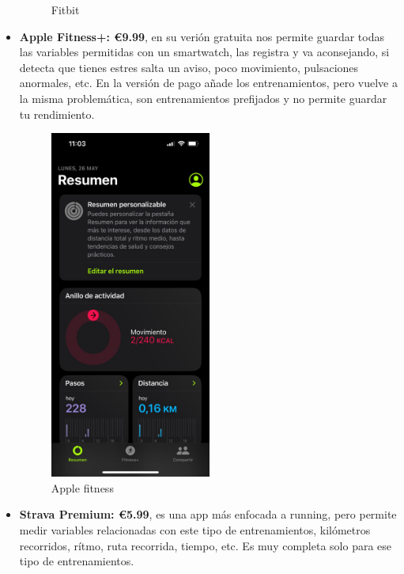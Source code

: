 \begin{itemize}
\begin{figure}[H]
    \caption{Fitbit}
    \label{fig:Fitbit}
\end{figure} 
	\item \textbf{Apple Fitness+: €9.99}, en su verión gratuita nos permite guardar todas las variables permitidas con un smartwatch, las registra y va aconsejando, si detecta que tienes estres salta un aviso, poco movimiento, pulsaciones anormales, etc. En la versión de pago añade los entrenamientos, pero vuelve a la misma problemática, son entrenamientos prefijados y no permite guardar tu rendimiento.
\begin{figure}[H]
   \centering
    \includegraphics[width=0.5\textwidth]{fotos/fitness.jpeg}
    \caption{Apple fitness}
    \label{fig:Apple fitness}
\end{figure} 
	\item \textbf{Strava Premium: €5.99}, es una app más enfocada a running, pero permite medir variables relacionadas con este tipo de entrenamientos, kilómetros recorridos, rítmo, ruta recorrida, tiempo, etc. Es muy completa solo para ese tipo de entrenamientos.
\begin{figure}[H]
   \centering

\end{figure}
\end{itemize}
